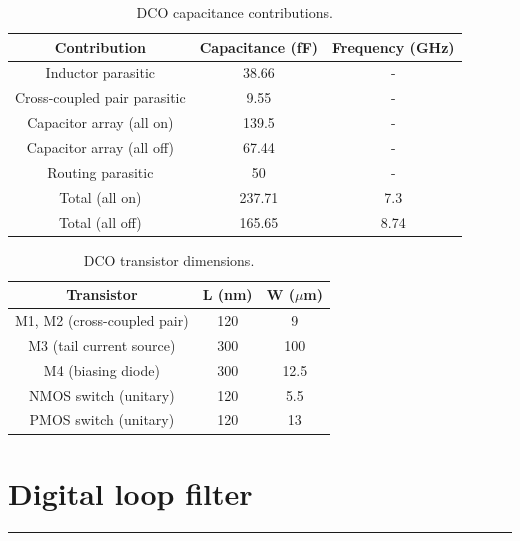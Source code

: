 \begin{table}[H]
    \centering
    \caption{DCO capacitance contributions.}
    \begin{tabular}{|c|c|c|}
        \hline
        Contribution & Capacitance (fF) & Frequency (GHz) \\
        \hline
        Inductor parasitic & 38.66 & - \\
        Cross-coupled pair parasitic & 9.55 & - \\
        Capacitor array (all on) & 139.5 & - \\
        Capacitor array (all off) & 67.44 & - \\
        Routing parasitic & 50 & - \\
        \hline
        Total (all on) & 237.71 & 7.3 \\
        Total (all off) & 165.65 & 8.74 \\
        \hline
    \end{tabular}
    \label{tab:DCO_capacitance_contribution}
\end{table}

\begin{table}[H]
    \centering
    \caption{DCO transistor dimensions.}
    \begin{tabular}{|c|c|c|}
        \hline
        Transistor & L (nm) & W ($\mu$m) \\
        \hline
        M1, M2 (cross-coupled pair) & 120 & 9 \\
        M3 (tail current source) & 300 & 100 \\
        M4 (biasing diode) & 300 & 12.5 \\
        NMOS switch (unitary) & 120 & 5.5 \\
        PMOS switch (unitary) & 120 & 13 \\
        \hline
    \end{tabular}
    \label{tab:DCO_dimensions}
\end{table}

\section{Digital loop filter}

\noindent\rule{\textwidth}{1pt}

\printbibliography[heading=subbibintoc]